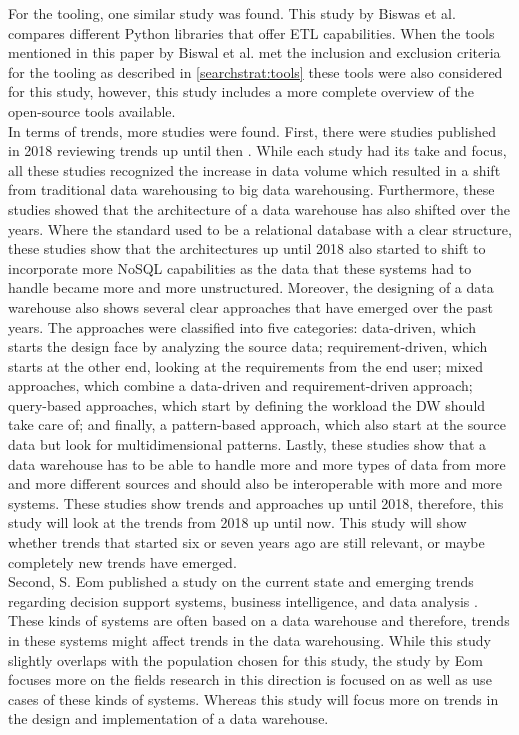 \documentclass[11pt]{article}
\begin{document}
For the tooling, one similar study was found. This study by Biswas et al.\cite{Biswas_programming2019267} compares different Python libraries that offer ETL capabilities. When the tools mentioned in this paper by Biswal et al. met the inclusion and exclusion criteria for the tooling as described in \ref{searchstrat:tools} these tools were also considered for this study, however, this study includes a more complete overview of the open-source tools available.\\

In terms of trends, more studies were found. First, there were studies published in 2018 reviewing trends up until then \cite{costa2018evaluating, kozmina2018information, golfarelli2017star, chandra2018comprehensive}. While each study had its take and focus, all these studies recognized the increase in data volume which resulted in a shift from traditional data warehousing to big data warehousing. Furthermore, these studies showed that the architecture of a data warehouse has also shifted over the years. Where the standard used to be a relational database with a clear structure, these studies show that the architectures up until 2018 also started to shift to incorporate more NoSQL capabilities as the data that these systems had to handle became more and more unstructured. Moreover, the designing of a data warehouse also shows several clear approaches that have emerged over the past years. The approaches were classified into five categories: data-driven, which starts the design face by analyzing the source data; requirement-driven, which starts at the other end, looking at the requirements from the end user; mixed approaches, which combine a data-driven and requirement-driven approach; query-based approaches, which start by defining the workload the DW should take care of; and finally, a pattern-based approach, which also start at the source data but look for multidimensional patterns. Lastly, these studies show that a data warehouse has to be able to handle more and more types of data from more and more different sources and should also be interoperable with more and more systems. These studies show trends and approaches up until 2018, therefore, this study will look at the trends from 2018 up until now. This study will show whether trends that started six or seven years ago are still relevant, or maybe completely new trends have emerged.\\

Second, S. Eom published a study on the current state and emerging trends regarding decision support systems, business intelligence, and data analysis \cite{eom2020dss}. These kinds of systems are often based on a data warehouse and therefore, trends in these systems might affect trends in the data warehousing. While this study slightly overlaps with the population chosen for this study, the study by Eom focuses more on the fields research in this direction is focused on as well as use cases of these kinds of systems. Whereas this study will focus more on trends in the design and implementation of a data warehouse. \\
\end{document}
